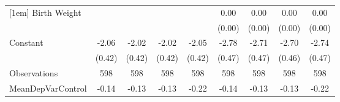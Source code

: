 {\begin{tabular}{l*{8}{c}}
[1em]
Birth Weight        &                     &                     &                     &                     &        0.00\sym{***}&        0.00\sym{***}&        0.00\sym{***}&        0.00\sym{***}\\
                    &                     &                     &                     &                     &      (0.00)         &      (0.00)         &      (0.00)         &      (0.00)         \\
[1em]
Constant            &       -2.06\sym{***}&       -2.02\sym{***}&       -2.02\sym{***}&       -2.05\sym{***}&       -2.78\sym{***}&       -2.71\sym{***}&       -2.70\sym{***}&       -2.74\sym{***}\\
                    &      (0.42)         &      (0.42)         &      (0.42)         &      (0.42)         &      (0.47)         &      (0.47)         &      (0.46)         &      (0.47)         \\
\hline
Observations        &         598         &         598         &         598         &         598         &         598         &         598         &         598         &         598         \\
MeanDepVarControl   &       -0.14         &       -0.13         &       -0.13         &       -0.22         &       -0.14         &       -0.13         &       -0.13         &       -0.22         \\
\hline\hline
\end{tabular}
}
